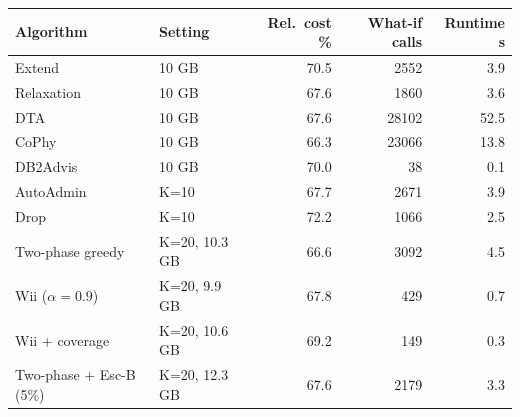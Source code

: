 \begin{tabular}{llrrr}
\toprule
Algorithm & Setting & Rel.\ cost \% & What-if calls & Runtime s\\
\midrule
Extend & 10 GB & 70.5 & 2552 & 3.9\\
Relaxation & 10 GB & 67.6 & 1860 & 3.6\\
DTA & 10 GB & 67.6 & 28102 & 52.5\\
CoPhy & 10 GB & 66.3 & 23066 & 13.8\\
DB2Advis & 10 GB & 70.0 & 38 & 0.1\\
AutoAdmin & K=10 & 67.7 & 2671 & 3.9\\
Drop & K=10 & 72.2 & 1066 & 2.5\\
Two-phase greedy & K=20, 10.3 GB & 66.6 & 3092 & 4.5\\
Wii ($\alpha{=}0.9$) & K=20, 9.9 GB & 67.8 & 429 & 0.7\\
Wii + coverage & K=20, 10.6 GB & 69.2 & 149 & 0.3\\
Two-phase + Esc-B (5\%) & K=20, 12.3 GB & 67.6 & 2179 & 3.3\\
\bottomrule
\end{tabular}
